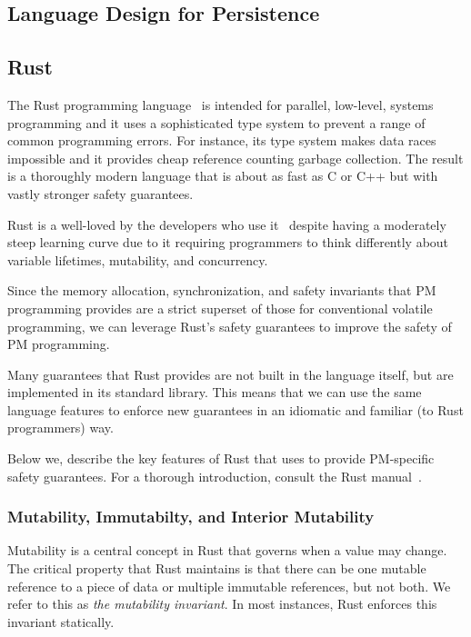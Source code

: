 \subsection{Language Design for Persistence}
\label{sec:pl}

\subsection{Rust}
\label{sec:rust}

The Rust programming language~\cite{rustbook} is intended for parallel,
low-level, systems programming and it uses a sophisticated type system to
prevent a range of common programming errors.  For instance, its type system 
makes data races impossible and it provides cheap reference counting garbage collection.
The result is a thoroughly modern language that is about as fast
as C or C++ but with vastly stronger safety guarantees.

Rust is a well-loved by the developers who use it~\cite{mostloved} despite having
a moderately steep learning curve due to it requiring
programmers to think differently about variable lifetimes, mutability, and
concurrency.

Since the memory allocation, synchronization, and safety invariants that PM
programming provides are a strict superset of those for conventional volatile
programming, we can leverage Rust's safety guarantees to improve the safety of
PM programming.

Many guarantees that Rust provides are not built in the
language itself, but are implemented in its standard library.  This means that
we can use the same language features to enforce new guarantees in an idiomatic
and familiar (to Rust programmers) way.

Below we, describe the key features of Rust that \this{} uses to provide
PM-specific safety guarantees.  For a thorough introduction, consult the Rust manual~\cite{rustbook}.

\subsubsection{Mutability, Immutabilty, and Interior Mutability}

Mutability is a central concept in Rust that governs when a value may change.
The critical property that Rust maintains is that there can be one mutable
reference to a piece of data or multiple immutable references, but not both.
We refer to this as \emph{the mutability invariant}.  In most instances, Rust
enforces this invariant statically.

